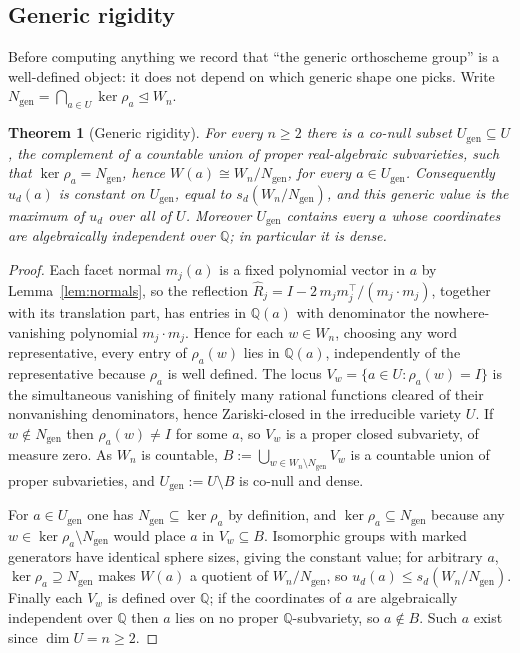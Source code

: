 \documentclass[11pt,a4paper]{article}
\newcommand{\Q}{\mathbb{Q}}
\newtheorem{theorem}{Theorem}
\theoremstyle{definition}
\theoremstyle{remark}
\theoremstyle{plain}
\begin{document}
\subsection{Generic rigidity}

Before computing anything we record that ``the generic orthoscheme group'' is a well-defined
object: it does not depend on which generic shape one picks. Write
$N_{\mathrm{gen}}=\bigcap_{a\in U}\ker\rho_a\trianglelefteq W_n$.

\begin{theorem}[Generic rigidity]\label{thm:rigidity}
For every $n\ge2$ there is a co-null subset $U_{\mathrm{gen}}\subseteq U$, the complement of a
countable union of proper real-algebraic subvarieties, such that
$\ker\rho_a=N_{\mathrm{gen}}$, hence $W(a)\cong W_n/N_{\mathrm{gen}}$, for every
$a\in U_{\mathrm{gen}}$. Consequently $u_d(a)$ is constant on $U_{\mathrm{gen}}$, equal to
$s_d(W_n/N_{\mathrm{gen}})$, and this generic value is the maximum of $u_d$ over all of $U$.
Moreover $U_{\mathrm{gen}}$ contains every $a$ whose coordinates are algebraically independent
over $\Q$; in particular it is dense.
\end{theorem}

\begin{proof}
Each facet normal $m_j(a)$ is a fixed polynomial vector in $a$ by Lemma~\ref{lem:normals}, so
the reflection $\widehat R_j=I-2\,m_jm_j^{\!\top}/(m_j\!\cdot\!m_j)$, together with its
translation part, has entries in $\Q(a)$ with denominator the nowhere-vanishing polynomial
$m_j\!\cdot\!m_j$. Hence for each $w\in W_n$, choosing any word representative, every entry of
$\rho_a(w)$ lies in $\Q(a)$, independently of the representative because $\rho_a$ is well
defined. The locus $V_w=\{a\in U:\rho_a(w)=I\}$ is the simultaneous vanishing of finitely many
rational functions cleared of their nonvanishing denominators, hence Zariski-closed in the
irreducible variety $U$. If $w\notin N_{\mathrm{gen}}$ then $\rho_a(w)\ne I$ for some $a$, so
$V_w$ is a proper closed subvariety, of measure zero. As $W_n$ is countable,
$B:=\bigcup_{w\in W_n\setminus N_{\mathrm{gen}}}V_w$ is a countable union of proper
subvarieties, and $U_{\mathrm{gen}}:=U\setminus B$ is co-null and dense.

For $a\in U_{\mathrm{gen}}$ one has $N_{\mathrm{gen}}\subseteq\ker\rho_a$ by definition, and
$\ker\rho_a\subseteq N_{\mathrm{gen}}$ because any
$w\in\ker\rho_a\setminus N_{\mathrm{gen}}$ would place $a$ in $V_w\subseteq B$. Isomorphic
groups with marked generators have identical sphere sizes, giving the constant value; for
arbitrary $a$, $\ker\rho_a\supseteq N_{\mathrm{gen}}$ makes $W(a)$ a quotient of
$W_n/N_{\mathrm{gen}}$, so $u_d(a)\le s_d(W_n/N_{\mathrm{gen}})$. Finally each $V_w$ is defined
over $\Q$; if the coordinates of $a$ are algebraically independent over $\Q$ then $a$ lies on no
proper $\Q$-subvariety, so $a\notin B$. Such $a$ exist since $\dim U=n\ge2$.
\end{proof}
\end{document}

